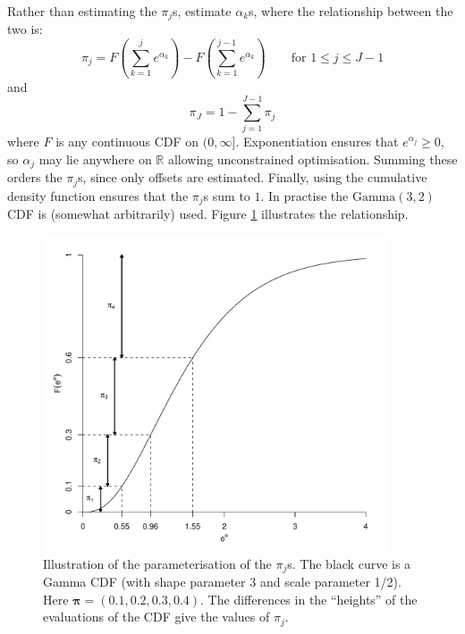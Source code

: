 Rather than estimating the $\pi_j$s, estimate $\alpha_k$s, where the relationship between the two is:
\begin{equation*}
\pi_j = F(\sum_{k=1}^j e^{\alpha_k}) - F(\sum_{k=1}^{j-1} e^{\alpha_k}) \qquad \text{for } 1\leq j \leq J-1
\end{equation*}
and
\begin{equation*}
\pi_J = 1-\sum_{j=1}^{J-1} \pi_j
\end{equation*}
where $F$ is any continuous CDF on $(0,\infty]$. Exponentiation ensures that $e^{\alpha_j}\geq0$, so $\alpha_j$ may lie anywhere on $\mathbb{R}$ allowing unconstrained optimisation. Summing these orders the $\pi_j$s, since only offsets are estimated. Finally, using the cumulative density function ensures that the $\pi_j$s sum to $1$. In practise the $\text{Gamma}(3,2)$ CDF is (somewhat arbitrarily) used. Figure \ref{dlbpi} illustrates the relationship.

\begin{figure}
\centering
\includegraphics[width=4in]{mix/figs/pidia.pdf}
\caption{Illustration of the parameterisation of the $\pi_j$s. The black curve is a Gamma CDF (with shape parameter 3 and scale parameter 1/2). Here $\bm{\pi}=(0.1,0.2,0.3,0.4)$. The differences in the ``heights'' of the evaluations of the CDF give the values of $\pi_j$.}
\label{dlbpi}
\end{figure}

